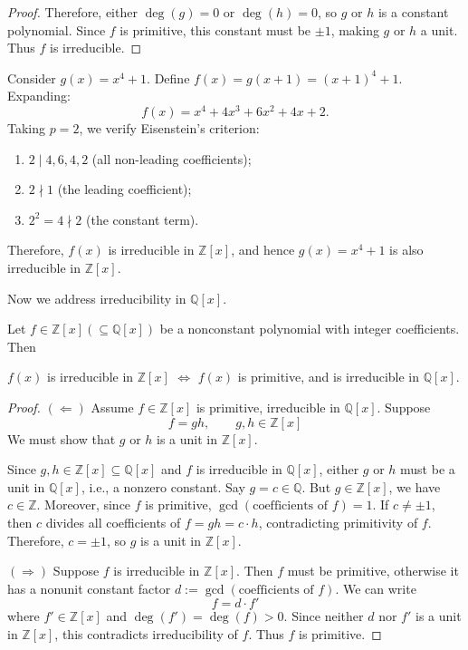 {\begin{proof}
Therefore, either $\deg(g) = 0$ or $\deg(h) = 0$, so $g$ or $h$ is a constant polynomial. Since $f$ is primitive, this constant must be $\pm 1$, making $g$ or $h$ a unit. Thus $f$ is irreducible.
\end{proof}

\begin{example}
Consider $g(x) = x^4 + 1$. Define $f(x) = g(x+1) = (x+1)^4 + 1$. Expanding:
\[
f(x) = x^4 + 4x^3 + 6x^2 + 4x + 2.
\]
Taking $p = 2$, we verify Eisenstein's criterion:
\begin{enumerate}
    \item $2 \mid 4, 6, 4, 2$ (all non-leading coefficients);
    \item $2 \nmid 1$ (the leading coefficient);
    \item $2^2 = 4 \nmid 2$ (the constant term).
\end{enumerate}
Therefore, $f(x)$ is irreducible in $\mathbb{Z}[x]$, and hence $g(x) = x^4 + 1$ is also irreducible in $\mathbb{Z}[x]$.
\end{example}

Now we address irreducibility in $\mathbb{Q}[x]$.

\begin{theorem}
Let $f \in \mathbb{Z}[x] (\subseteq \mathbb{Q}[x])$ be a nonconstant polynomial with integer coefficients. Then 
\begin{center}
$f(x)$ is irreducible in $\mathbb{Z}[x]$ \quad  $\Longleftrightarrow$ \quad $f(x)$ is primitive, and is irreducible in $\mathbb{Q}[x]$.
\end{center}
\end{theorem}

\begin{proof}
$(\Leftarrow)$ Assume $f \in \mathbb{Z}[x]$ is primitive, irreducible in $\mathbb{Q}[x]$. Suppose 
$$f = gh, \quad \quad g, h \in \mathbb{Z}[x]$$ 
We must show that $g$ or $h$ is a unit in $\mathbb{Z}[x]$.

Since $g, h \in \mathbb{Z}[x] \subseteq \mathbb{Q}[x]$ and $f$ is irreducible in $\mathbb{Q}[x]$, either $g$ or $h$ must be a unit in $\mathbb{Q}[x]$, i.e., a nonzero constant. Say $g = c \in \mathbb{Q}$. But $g \in \mathbb{Z}[x]$, we have $c \in \mathbb{Z}$. Moreover, since $f$ is primitive, $\gcd(\text{coefficients of } f) = 1$. If $c \neq \pm 1$, then $c$ divides all coefficients of $f = gh = c \cdot h$, contradicting primitivity of $f$. Therefore, $c = \pm 1$, so $g$ is a unit in $\mathbb{Z}[x]$.

$(\Rightarrow)$ Suppose $f$ is irreducible in $\mathbb{Z}[x]$.
Then $f$ must be primitive, otherwise it has a nonunit constant factor $d := \gcd(\text{coefficients of } f)$. We can write 
$$f = d \cdot f'$$ 
where $f' \in \mathbb{Z}[x]$ and $\deg(f') = \deg(f) > 0$. Since neither $d$ nor $f'$ is a unit in $\mathbb{Z}[x]$, this contradicts irreducibility of $f$. Thus $f$ is primitive.


\end{proof}}
